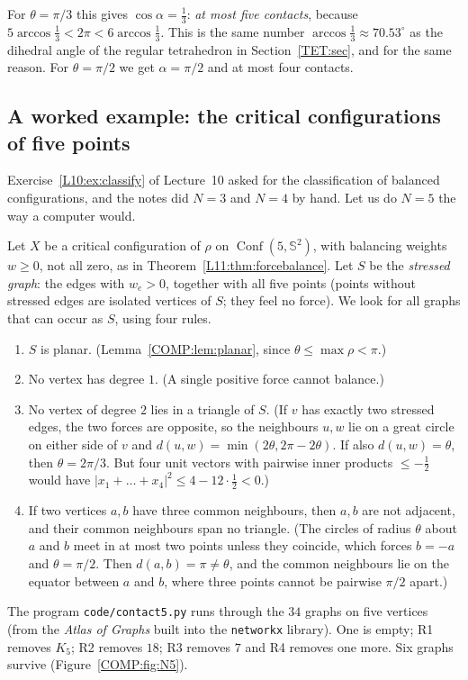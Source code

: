 \documentclass[11pt,openany]{book}
\theoremstyle{plain}
\theoremstyle{definition}
\theoremstyle{remark}
\newcommand{\Sph}{\mathbb{S}}          %
\newcommand{\Conf}{\operatorname{Conf}}
\newcommand{\abs}[1]{\left\lvert #1 \right\rvert}
\begin{document}
For $\theta=\pi/3$ this gives $\cos\alpha=\frac13$: \emph{at most five contacts}, because
$5\arccos\frac13<2\pi<6\arccos\frac13$. This is the same number $\arccos\frac13\approx70.53^\circ$ as the
dihedral angle of the regular tetrahedron in Section~\ref{TET:sec}, and for the same reason. For
$\theta=\pi/2$ we get $\alpha=\pi/2$ and at most four contacts.

\subsection{A worked example: the critical configurations of five points}
Exercise~\ref{L10:ex:classify} of Lecture~10 asked for the classification of balanced configurations,
and the notes did $N=3$ and $N=4$ by hand. Let us do $N=5$ the way a computer would.

Let $X$ be a critical configuration of $\rho$ on $\Conf(5,\Sph^2)$, with balancing weights $w\ge0$, not
all zero, as in Theorem~\ref{L11:thm:forcebalance}. Let $S$ be the \emph{stressed graph}: the edges with
$w_e>0$, together with all five points (points without stressed edges are isolated vertices of $S$;
they feel no force). We look for all graphs that can occur as $S$, using four rules.
\begin{enumerate}[label=\textbf{R\arabic*},leftmargin=*]
\item $S$ is planar. (Lemma~\ref{COMP:lem:planar}, since $\theta\le\max\rho<\pi$.)
\item No vertex has degree $1$. (A single positive force cannot balance.)
\item No vertex of degree $2$ lies in a triangle of $S$. (If $v$ has exactly two stressed edges, the two
  forces are opposite, so the neighbours $u,w$ lie on a great circle on either side of $v$ and
  $d(u,w)=\min(2\theta,2\pi-2\theta)$. If also $d(u,w)=\theta$, then $\theta=2\pi/3$. But four unit vectors
  with pairwise inner products $\le-\frac12$ would have $\abs{x_1+\dots+x_4}^2\le4-12\cdot\frac12<0$.)
\item If two vertices $a,b$ have three common neighbours, then $a,b$ are not adjacent, and their
  common neighbours span no triangle. (The circles of radius $\theta$ about $a$ and $b$ meet in at most two
  points unless they coincide, which forces $b=-a$ and $\theta=\pi/2$. Then $d(a,b)=\pi\ne\theta$, and the
  common neighbours lie on the equator between $a$ and $b$, where three points cannot be pairwise
  $\pi/2$ apart.)
\end{enumerate}
The program \texttt{code/contact5.py} runs through the $34$ graphs on five vertices (from the
\emph{Atlas of Graphs} built into the \texttt{networkx} library). One is empty; R1 removes $K_5$; R2 removes $18$;
R3 removes $7$ and R4 removes one more. Six graphs survive (Figure~\ref{COMP:fig:N5}).
\end{document}
